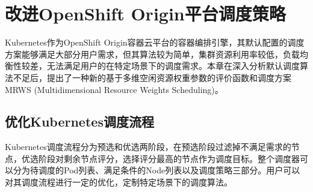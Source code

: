 \chapter{改进OpenShift Origin平台调度策略}
Kubernetes作为OpenShift Origin容器云平台的容器编排引擎，其默认配置的调度方案能够满足大部分用户需求，但其算法较为简单，集群资源利用率较低，负载均衡性较差，无法满足用户的在特定场景下的调度需求。本章在深入分析默认调度算法不足后，提出了一种新的基于多维空闲资源权重参数的评价函数和调度方案MRWS (Multidimensional Resource Weights Scheduling)。

\section{优化Kubernetes调度流程}
Kubernetes调度流程分为预选和优选两阶段，在预选阶段过滤掉不满足需求的节点，优选阶段对剩余节点评分，选择评分最高的节点作为调度目标。整个调度器可以分为待调度的Pod列表、满足条件的Node列表以及调度策略三部分。用户可以对其调度流程进行一定的优化，定制特定场景下的调度算法。

